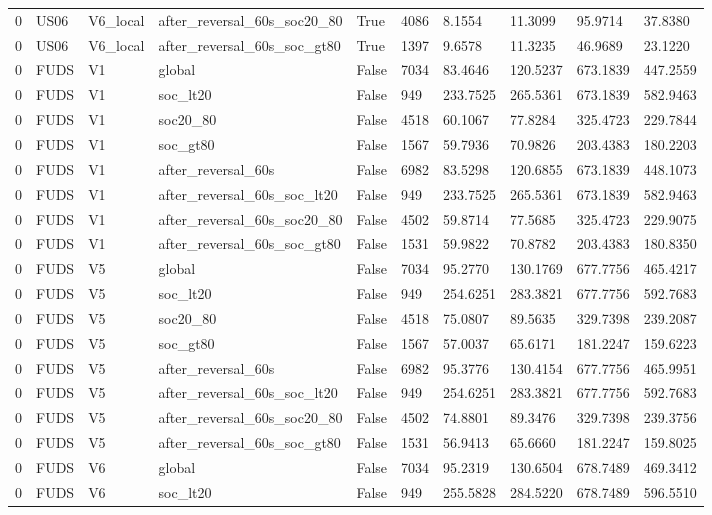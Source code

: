 \begin{tabular}{llllllllll}
0 & US06 & V6\_local & after\_reversal\_60s\_soc20\_80 & True & 4086 & 8.1554 & 11.3099 & 95.9714 & 37.8380 \\
0 & US06 & V6\_local & after\_reversal\_60s\_soc\_gt80 & True & 1397 & 9.6578 & 11.3235 & 46.9689 & 23.1220 \\
0 & FUDS & V1 & global & False & 7034 & 83.4646 & 120.5237 & 673.1839 & 447.2559 \\
0 & FUDS & V1 & soc\_lt20 & False & 949 & 233.7525 & 265.5361 & 673.1839 & 582.9463 \\
0 & FUDS & V1 & soc20\_80 & False & 4518 & 60.1067 & 77.8284 & 325.4723 & 229.7844 \\
0 & FUDS & V1 & soc\_gt80 & False & 1567 & 59.7936 & 70.9826 & 203.4383 & 180.2203 \\
0 & FUDS & V1 & after\_reversal\_60s & False & 6982 & 83.5298 & 120.6855 & 673.1839 & 448.1073 \\
0 & FUDS & V1 & after\_reversal\_60s\_soc\_lt20 & False & 949 & 233.7525 & 265.5361 & 673.1839 & 582.9463 \\
0 & FUDS & V1 & after\_reversal\_60s\_soc20\_80 & False & 4502 & 59.8714 & 77.5685 & 325.4723 & 229.9075 \\
0 & FUDS & V1 & after\_reversal\_60s\_soc\_gt80 & False & 1531 & 59.9822 & 70.8782 & 203.4383 & 180.8350 \\
0 & FUDS & V5 & global & False & 7034 & 95.2770 & 130.1769 & 677.7756 & 465.4217 \\
0 & FUDS & V5 & soc\_lt20 & False & 949 & 254.6251 & 283.3821 & 677.7756 & 592.7683 \\
0 & FUDS & V5 & soc20\_80 & False & 4518 & 75.0807 & 89.5635 & 329.7398 & 239.2087 \\
0 & FUDS & V5 & soc\_gt80 & False & 1567 & 57.0037 & 65.6171 & 181.2247 & 159.6223 \\
0 & FUDS & V5 & after\_reversal\_60s & False & 6982 & 95.3776 & 130.4154 & 677.7756 & 465.9951 \\
0 & FUDS & V5 & after\_reversal\_60s\_soc\_lt20 & False & 949 & 254.6251 & 283.3821 & 677.7756 & 592.7683 \\
0 & FUDS & V5 & after\_reversal\_60s\_soc20\_80 & False & 4502 & 74.8801 & 89.3476 & 329.7398 & 239.3756 \\
0 & FUDS & V5 & after\_reversal\_60s\_soc\_gt80 & False & 1531 & 56.9413 & 65.6660 & 181.2247 & 159.8025 \\
0 & FUDS & V6 & global & False & 7034 & 95.2319 & 130.6504 & 678.7489 & 469.3412 \\
0 & FUDS & V6 & soc\_lt20 & False & 949 & 255.5828 & 284.5220 & 678.7489 & 596.5510 \\

\end{tabular}
